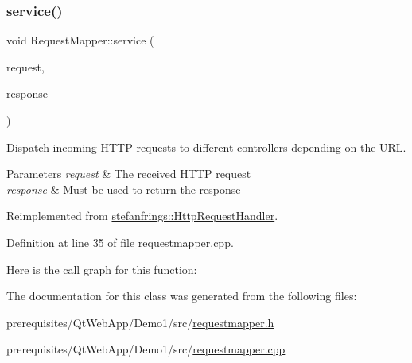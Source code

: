 \subsubsection{\texorpdfstring{service()}{service()}}
{\footnotesize\ttfamily void Request\+Mapper\+::service (\begin{DoxyParamCaption}\item[{\mbox{\hyperlink{classstefanfrings_1_1_http_request}{Http\+Request}} \&}]{request,  }\item[{\mbox{\hyperlink{classstefanfrings_1_1_http_response}{Http\+Response}} \&}]{response }\end{DoxyParamCaption})\hspace{0.3cm}{\ttfamily [virtual]}}

Dispatch incoming H\+T\+TP requests to different controllers depending on the U\+RL. 
\begin{DoxyParams}{Parameters}
{\em request} & The received H\+T\+TP request \\
\hline
{\em response} & Must be used to return the response \\
\hline
\end{DoxyParams}


Reimplemented from \mbox{\hyperlink{classstefanfrings_1_1_http_request_handler_a0a7210907152c46b8b5a47feb64cf6bd}{stefanfrings\+::\+Http\+Request\+Handler}}.



Definition at line 35 of file requestmapper.\+cpp.

Here is the call graph for this function\+:


The documentation for this class was generated from the following files\+:\begin{DoxyCompactItemize}
\item 
prerequisites/\+Qt\+Web\+App/\+Demo1/src/\mbox{\hyperlink{requestmapper_8h}{requestmapper.\+h}}\item 
prerequisites/\+Qt\+Web\+App/\+Demo1/src/\mbox{\hyperlink{requestmapper_8cpp}{requestmapper.\+cpp}}\end{DoxyCompactItemize}
